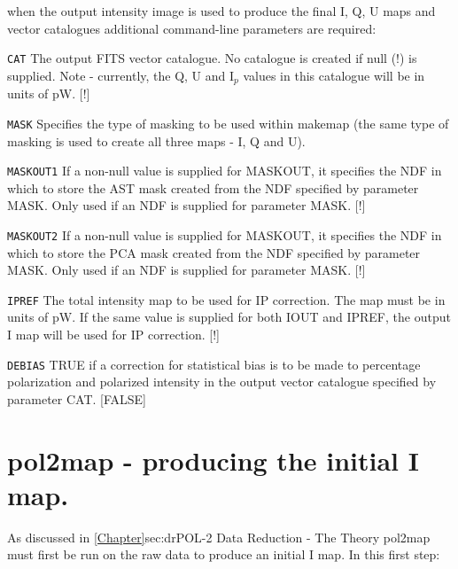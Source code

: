 when the output intensity image is used to produce the final I, Q, U 
maps and vector catalogues additional command-line parameters are required:

\begin{aligndesc}

\item[\texttt{CAT}]
The output FITS vector catalogue. No catalogue is created if
null (!) is supplied. Note - currently, the Q, U  and I$_{p}$ values
in this catalogue will be in units of pW. [!]


\item[\texttt{MASK}]
Specifies the type of masking to be used within makemap (the
same type of masking is used to create all three maps - I, Q
and U).


\item[\texttt{MASKOUT1}]
If a non-null value is supplied for MASKOUT, it specifies the NDF
in which to store the AST mask created from the NDF specified by
parameter MASK. Only used if an NDF is supplied for parameter
MASK. [!]


\item[\texttt{MASKOUT2}]
If a non-null value is supplied for MASKOUT, it specifies the NDF
in which to store the PCA mask created from the NDF specified by
parameter MASK. Only used if an NDF is supplied for parameter
MASK. [!]


\item[\texttt{IPREF}]
The total intensity map to be used for IP correction. The map must
be in units of pW. If the same value is supplied for both IOUT
and IPREF, the output I map will be used for IP correction. [!]

\item[\texttt{DEBIAS}]
TRUE if a correction for statistical bias is to be made to
percentage polarization and polarized intensity in the output
vector catalogue specified by parameter CAT. [FALSE]



\end{aligndesc}



\section{pol2map - producing the initial I map.}

As discussed in \cref{Chapter}{sec:dr}{POL-2 Data Reduction - The Theory} pol2map must first be run on the raw data to produce an initial I map.
In this first step:

